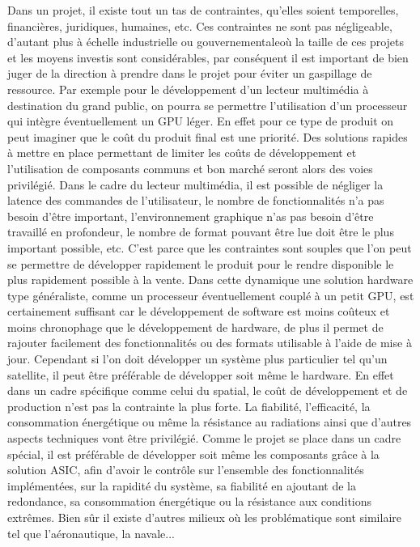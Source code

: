\documentclass[a4paper,12pt]{article}
\begin{document}
Dans un projet, il existe tout un tas de contraintes, qu'elles soient temporelles, financières, juridiques, humaines, etc. Ces contraintes ne sont pas négligeable, d'autant plus à échelle industrielle ou gouvernementale\footnotemark[1] où la taille de ces projets et les moyens investis sont considérables, par conséquent il est important de bien juger de la direction à prendre dans le projet pour éviter un gaspillage de ressource. 
Par exemple pour le développement d'un lecteur multimédia à destination du grand public, on pourra se permettre l'utilisation d'un processeur qui intègre éventuellement un GPU léger. En effet pour ce type de produit on peut imaginer que le coût du produit final est une priorité. Des solutions rapides à mettre en place permettant de limiter les coûts de développement et l'utilisation de composants communs et bon marché seront alors des voies privilégié. Dans le cadre du lecteur multimédia, il est possible de négliger la latence des commandes de l'utilisateur, le nombre de fonctionnalités n'a pas besoin d'être important, l'environnement graphique n'as pas besoin d'être travaillé en profondeur, le nombre de format pouvant être lue doit être le plus important possible, etc. C'est parce que les contraintes sont souples que l'on peut se permettre de développer rapidement le produit pour le rendre disponible le plus rapidement possible à la vente. Dans cette dynamique une solution hardware type généraliste, comme un processeur éventuellement couplé à un petit GPU, est certainement suffisant car le développement de software est moins coûteux et moins chronophage que le développement de hardware, de plus il permet de rajouter facilement des fonctionnalités ou des formats utilisable à l'aide de mise à jour. 
Cependant si l'on doit développer un système plus particulier tel qu'un satellite\footnotemark[2], il peut être préférable de développer soit même le hardware. En effet dans un cadre spécifique comme celui du spatial, le coût de développement et de production n'est pas la contrainte la plus forte. La fiabilité, l'efficacité, la consommation énergétique ou même la résistance au radiations ainsi que d'autres aspects techniques vont être privilégié. Comme le projet se place dans un cadre spécial, il est préférable de développer soit même les composants grâce à la solution ASIC, afin d'avoir le contrôle sur l'ensemble des fonctionnalités implémentées, sur la rapidité du système, sa fiabilité en ajoutant de la redondance, sa consommation énergétique ou la résistance aux conditions extrêmes. Bien sûr il existe d'autres milieux où les problématique sont similaire tel que l'aéronautique, la navale...\newline
\end{document}
